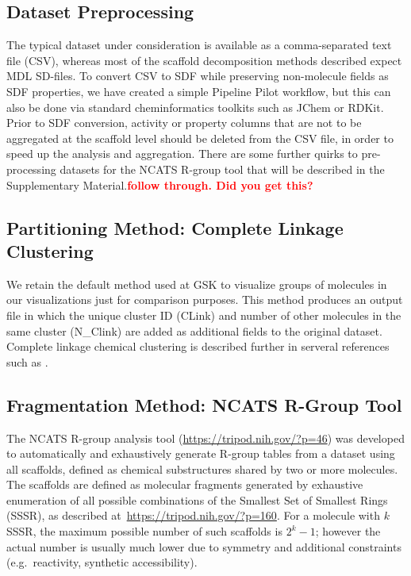 \documentclass[journal=jacsat,manuscript=article]{achemso}
\newcommand*\eg{e.g.~}
\begin{document}
\subsection{Dataset Preprocessing}
\label{sec:prepro}
The typical dataset under consideration is available as a
comma-separated text file (CSV), whereas most of the scaffold
decomposition methods described expect MDL SD-files. To convert CSV to
SDF while preserving non-molecule fields as SDF properties, we have
created a simple Pipeline Pilot workflow, but this can also be done
via standard cheminformatics toolkits such as JChem or RDKit. Prior to
SDF conversion, activity or property columns that are not to be
aggregated at the scaffold level should be deleted from the CSV file,
in order to speed up the analysis and aggregation.  There are some
further quirks to pre-processing datasets for the NCATS R-group tool
that will be described in the Supplementary
Material.\textbf{\textcolor{red}{follow through. Did you get this?}}

\subsection{Partitioning Method: Complete Linkage Clustering}
We retain the default method used at GSK to visualize groups of
molecules in our visualizations just for comparison purposes. This
method produces an output file in which the unique cluster ID (CLink)
and number of other molecules in the same cluster (N\_Clink) are added
as additional fields to the original dataset.  Complete linkage
chemical clustering is described further in serveral references such
as \citeauthor{Jain2010,Downs2003}.

\subsection{Fragmentation Method: NCATS R-Group Tool}
\label{sec:rgtool}
The NCATS R-group analysis tool (\url{https://tripod.nih.gov/?p=46})
was developed to automatically and exhaustively generate R-group
tables from a dataset using all scaffolds, defined as chemical
substructures shared by two or more molecules. The scaffolds are
defined as molecular fragments generated by exhaustive enumeration of
all possible combinations of the Smallest Set of Smallest Rings
(SSSR), as described at~\url{https://tripod.nih.gov/?p=160}. For a
molecule with $k$ SSSR, the maximum possible number of such scaffolds
is $2^k - 1$; however the actual number is usually much lower due to
symmetry and additional constraints (\eg reactivity, synthetic
accessibility).
\end{document}
